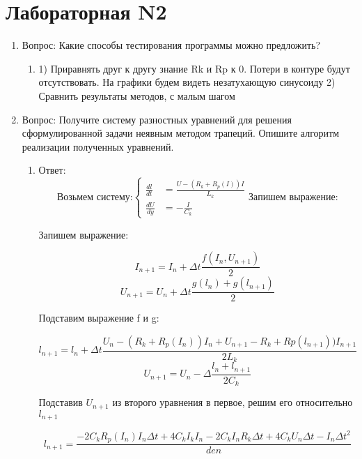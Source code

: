 \documentclass[12pt,a4paper]{scrartcl}
\begin{document}
	\section{Лабораторная N2}
	\begin{enumerate}
		\item Вопрос: Какие способы тестирования программы можно предложить?\begin{enumerate}
			\item 1) Приравнять друг к другу знание Rk и Rp к 0. Потери в контуре будут отсутствовать. На графики будем видеть незатухающую синусоиду
			2) Сравнить результаты методов, с малым шагом
		\end{enumerate}
		\item Вопрос: Получите систему разностных уравнений для решения сформулированной задачи неявным методом трапеций. Опишите
		алгоритм реализации полученных уравнений. \begin{enumerate}			
			\item Ответ:\begin{equation}
			\text{Возьмем систему:}
			\begin{cases}
			\frac{dl}{dt} & =\frac{U - (R_k + R_p(I))I}{L_k}\\
			\frac{dU}{dy} & =-\frac{I}{C_k}
			\end{cases}
			\text{Запишем выражение:}
			\end{equation}
			
			Запишем выражение:
			
			\begin{equation}
			I_{n+1} = I_n + \Delta t\frac{f(I_n, U_{n+1})}{2}
			\end{equation}
			\begin{equation}
			U_{n+1} = U_n + \Delta t\frac{g(l_n) + g(l_{n+1})}{2}
			\end{equation}
			
			Подставим выражение f и g:
			
			\begin{equation}
			l_{n + 1} = l_n + \Delta t\frac{U_n - (R_k + R_p(I_n))I_n + U_{n+1} - R_k + Rp(l_{n+1}))I_{n+1}}{2L_k}
			\end{equation}
			\begin{equation}
			U_{n+1} = U_n - \Delta\frac{l_n + l_{n+1}}{2C_k}
			\end{equation}
			
			Подставив $U_{n+1}$ из второго уравнения в первое, решим его относительно $l_{n+1}$
			
			\begin{equation}
			l_{n+1} = \frac{-2C_kR_p(I_n)I_n\Delta t + 4C_kI_kI_n - 2C_kI_nR_k\Delta t + 4C_kU_n\Delta t - I_n\Delta t^2}{den}
			\end{equation}
			

\end{enumerate}
\end{enumerate}
\end{document}
